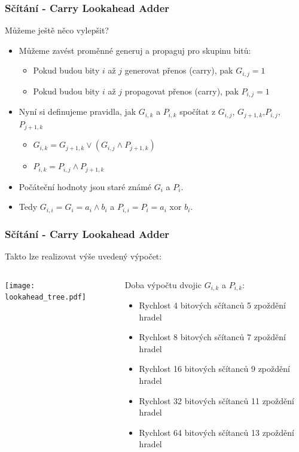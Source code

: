 \documentclass{beamer}
\begin{document}
\begin{frame}
\frametitle{Sčítání - Carry Lookahead Adder}

Můžeme ještě něco vylepšit?
\begin{itemize}
\item Můžeme zavést proměnné generuj a propaguj pro skupinu bitů:
\begin{itemize}
\item Pokud budou bity $i$ až $j$ generovat přenos (carry), pak $G_{i,j}=1$
\item Pokud budou bity $i$ až $j$ propagovat přenos (carry), pak $P_{i,j}=1$
\end{itemize}
\item Nyní si definujeme pravidla, jak $G_{i,k}$ a $P_{i,k}$ spočítat z $G_{i,j}$, $G_{j+1,k}$,$P_{i,j}$, $P_{j+1,k}$
\begin{itemize}
\item $G_{i,k}=G_{j+1,k} \lor (G_{i,j} \land P_{j+1,k})$
\item $P_{i,k}=P_{i,j} \land P_{j+1,k}$
\end{itemize}
\item Počáteční hodnoty jsou staré známé $G_i$ a $P_i$. 
\item Tedy $G_{i,i}=G_i=a_i \land b_i$ a $P_{i,i}=P_i=a_i$ xor $b_i$.
\end{itemize}

\end{frame}

\begin{frame}
\frametitle{Sčítání - Carry Lookahead Adder}

Takto lze realizovat výše uvedený výpočet:
\begin{columns}
\begin{column}{0.55\textwidth}
\begin{center}
   \texttt{[image: lookahead\_tree.pdf]}
\end{center}
\end{column}
\begin{column}{0.45\textwidth}

Doba výpočtu dvojic $G_{i,k}$ a $P_{i,k}$:
\begin{itemize}
\item Rychlost 4 bitových sčítanců 5 zpoždění hradel
\item Rychlost 8 bitových sčítanců 7 zpoždění hradel
\item Rychlost 16 bitových sčítanců 9 zpoždění hradel
\item Rychlost 32 bitových sčítanců 11 zpoždění hradel
\item Rychlost 64 bitových sčítanců 13 zpoždění hradel
\end{itemize}

\end{column}
\end{columns}

\end{frame}
\end{document}
